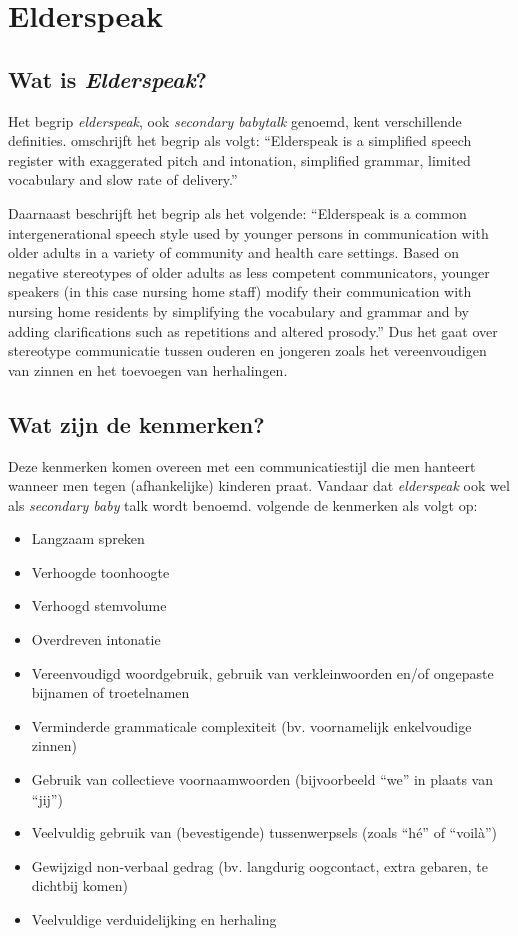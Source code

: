 \section{Elderspeak}

\subsection{Wat is \textit{Elderspeak}?}

Het begrip \textit{elderspeak}, ook \textit{secondary babytalk} genoemd, kent verschillende definities. \textcite{Kemper1998} omschrijft het begrip als volgt:
``Elderspeak is a simplified speech register with exaggerated pitch and intonation, simplified grammar, limited vocabulary and slow rate of delivery.''

Daarnaast beschrijft \textcite{Williams2011} het begrip als het volgende:
``Elderspeak is a common intergenerational speech style used by younger persons in communication with older adults in a variety of community and health care settings. Based on negative stereotypes of older adults as less competent communicators, younger speakers (in this case nursing home staff) modify their communication with nursing home residents by simplifying the vocabulary and grammar and by adding clarifications such as repetitions and altered prosody.'' Dus het gaat over stereotype communicatie tussen ouderen en jongeren zoals het vereenvoudigen van zinnen en het toevoegen van herhalingen.

\subsection{Wat zijn de kenmerken?}
Deze kenmerken komen overeen met een communicatiestijl die men hanteert wanneer men tegen (afhankelijke) kinderen praat. Vandaar dat \textit{elderspeak} ook wel als \textit{secondary baby} talk wordt benoemd. \textcite{Campens2021} volgende de kenmerken als volgt op:

\begin{itemize}
    \item Langzaam spreken
    \item Verhoogde toonhoogte
    \item Verhoogd stemvolume
    \item Overdreven intonatie
    \item Vereenvoudigd woordgebruik, gebruik van verkleinwoorden en/of ongepaste bijnamen of troetelnamen
    \item Verminderde grammaticale complexiteit (bv. voornamelijk enkelvoudige zinnen)
    \item Gebruik van collectieve voornaamwoorden (bijvoorbeeld ``we'' in plaats van ``jij'')
    \item Veelvuldig gebruik van (bevestigende) tussenwerpsels (zoals ``hé'' of ``voilà'')
    \item Gewijzigd non-verbaal gedrag (bv. langdurig oogcontact, extra gebaren, te dichtbij komen)
    \item Veelvuldige verduidelijking en herhaling
\end{itemize}

